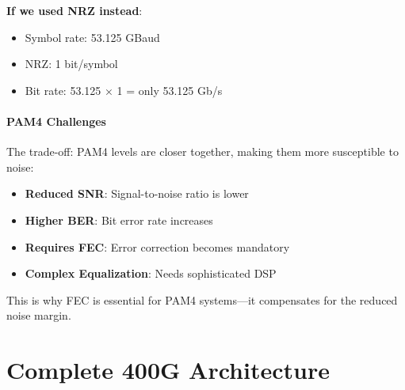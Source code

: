 \documentclass[openany]{tufte-book}
\begin{document}
\textbf{If we used NRZ instead}:
\begin{itemize}
\item Symbol rate: 53.125 GBaud
\item NRZ: 1 bit/symbol
\item Bit rate: 53.125 × 1 = only 53.125 Gb/s
\end{itemize}


\paragraph{PAM4 Challenges}

The trade-off: PAM4 levels are closer together, making them more susceptible to noise:

\begin{itemize}
\item \textbf{Reduced SNR}: Signal-to-noise ratio is lower
\item \textbf{Higher BER}: Bit error rate increases
\item \textbf{Requires FEC}: Error correction becomes mandatory
\item \textbf{Complex Equalization}: Needs sophisticated DSP
\end{itemize}

This is why FEC is essential for PAM4 systems---it compensates for the reduced noise margin.

\section{Complete 400G Architecture}
\end{document}
